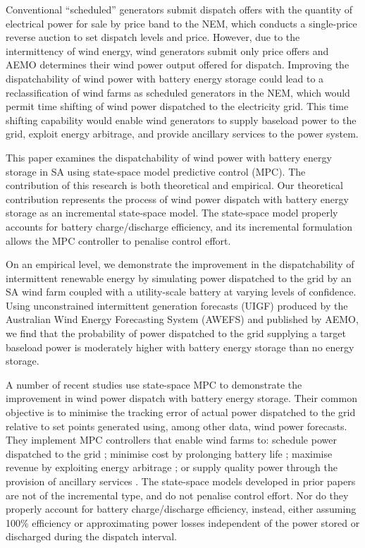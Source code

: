 \documentclass[conference]{IEEEtran}
\begin{document}
Conventional ``scheduled'' generators submit dispatch offers with the quantity of electrical power for sale by price band to the NEM, which conducts a single-price reverse auction to set dispatch levels and price.  However, due to the intermittency of wind energy, wind generators submit only price offers and AEMO determines their wind power output offered for dispatch.  Improving the dispatchability of wind power with battery energy storage could lead to a reclassification of wind farms as scheduled generators in the NEM, which would permit time shifting of wind power dispatched to the electricity grid.  This time shifting capability would enable wind generators to supply baseload power to the grid, exploit energy arbitrage, and provide ancillary services to the power system.

This paper examines the dispatchability of wind power with battery energy storage in SA using state-space model predictive control (MPC).  The contribution of this research is both theoretical and empirical.  Our theoretical contribution represents the process of wind power dispatch with battery energy storage as an incremental state-space model.  The state-space model properly accounts for battery charge/discharge efficiency, and its incremental formulation allows the MPC controller to penalise control effort.  

On an empirical level, we demonstrate the improvement in the dispatchability of intermittent renewable energy by simulating power dispatched to the grid by an SA wind farm coupled with a utility-scale battery at varying levels of confidence.  Using unconstrained intermittent generation forecasts (UIGF) produced by the Australian Wind Energy Forecasting System (AWEFS) and published by AEMO, we find that the probability of power dispatched to the grid supplying a target baseload power is moderately higher with battery energy storage than no energy storage.

A number of recent studies use state-space MPC to demonstrate the improvement in wind power dispatch with battery energy storage.  Their common objective is to minimise the tracking error of actual power dispatched to the grid relative to set points generated using, among other data, wind power forecasts.  They implement MPC controllers that enable wind farms to: schedule power dispatched to the grid \citep{HALBB14,TBBH10}; minimise cost by prolonging battery life \citep{KS10,YCTL12}; maximise revenue by exploiting energy arbitrage \citep{KKSA13}; or supply quality power through the provision of ancillary services \citep{YCTL14}.  The state-space models developed in prior papers are not of the incremental type, and do not penalise control effort.  Nor do they properly account for battery charge/discharge efficiency, instead, either assuming 100\% efficiency or approximating power losses independent of the power stored or discharged during the dispatch interval.
\end{document}
